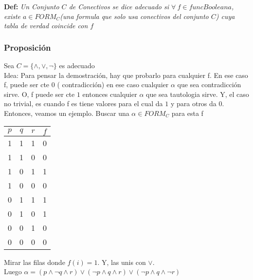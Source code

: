 \documentclass[14pt,a4paper,fleqn]{article}
\begin{document}
\textbf{Def:} \emph{Un Conjunto $C$ de Conectivos se dice adecuado si $\forall \: f \in funcBooleana$, existe $a \in FORM_{C}$(una formula que solo usa conectivos del conjunto $C$) cuya tabla de verdad coincide con $f$}
\newpage
\subsubsection*{Proposición}
Sea $C = \{ \wedge, \vee, \neg \} $ es adecuado\\
Idea: Para pensar la demostración, hay que probarlo para cualquier f. En ese caso f, puede ser cte $0$ ( contradicción) en ese caso cualquier $\alpha$ que sea contradicción sirve. O, f puede ser cte $1$ entonces cualquier $\alpha$ que sea tautologia sirve. Y, el caso no trivial, es cuando f es tiene valores para el cual da $1$ y para otros da $0$. Entonces, veamos un ejemplo. Buscar una $\alpha \in FORM_{C}$ para esta f
\begin{center}
\begin{tabular}{c|c|c|c}
$p$ & $q$ & $r$ & $f$ \\
\hline
1 & 1 & 1 & 0 \\
1 & 1 & 0 & 0 \\
\rowcolor{green} 1 & 0 & 1 & 1 \\
1 & 0 & 0 & 0 \\
\rowcolor{green} 0 & 1 & 1 & 1 \\
\rowcolor{green} 0 & 1 & 0 & 1 \\
0 & 0 & 1 & 0 \\
0 & 0 & 0 & 0 \\
\end{tabular}
\end{center}
Mirar las filas donde $f(i) = 1$. Y, las unis con $\vee$. \\
Luego $\alpha = (p \wedge \neg q \wedge r) \vee (\neg p \wedge q \wedge r) \vee (\neg p \wedge q \wedge \neg r)$
\end{document}
